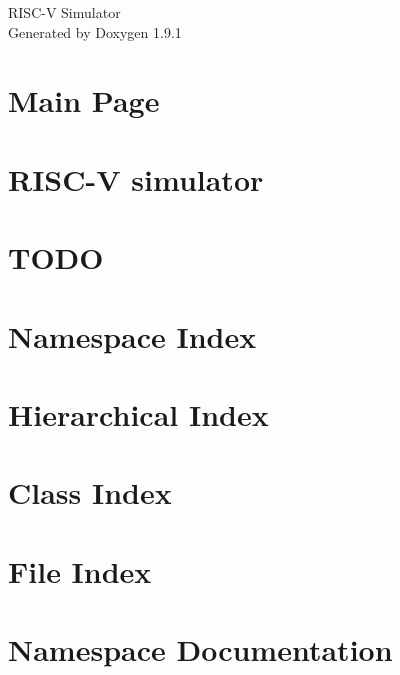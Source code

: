 \let\mypdfximage\pdfximage\def\pdfximage{\immediate\mypdfximage}\documentclass[twoside]{book}
\newcommand{\+}{\discretionary{\mbox{\scriptsize$\hookleftarrow$}}{}{}}
\newcommand{\clearemptydoublepage}{%
  \newpage{\pagestyle{empty}\cleardoublepage}%
}
\begin{document}
\raggedbottom

\hypersetup{pageanchor=false,
             bookmarksnumbered=true,
             pdfencoding=unicode
            }
\begin{titlepage}
\vspace*{7cm}
\begin{center}%
{\Large RISC-\/V Simulator }\\
\vspace*{1cm}
{\large Generated by Doxygen 1.9.1}\\
\end{center}
\end{titlepage}
\clearemptydoublepage
{}
\tableofcontents
\clearemptydoublepage
{}
\hypersetup{pageanchor=true}

\chapter{Main Page}
\label{index}\hypertarget{index}{}
\chapter{RISC-\/V simulator}
\label{md_README}

\chapter{TODO}
\label{md_TODO}

\chapter{Namespace Index}

\chapter{Hierarchical Index}

\chapter{Class Index}

\chapter{File Index}

\chapter{Namespace Documentation}









\end{document}
